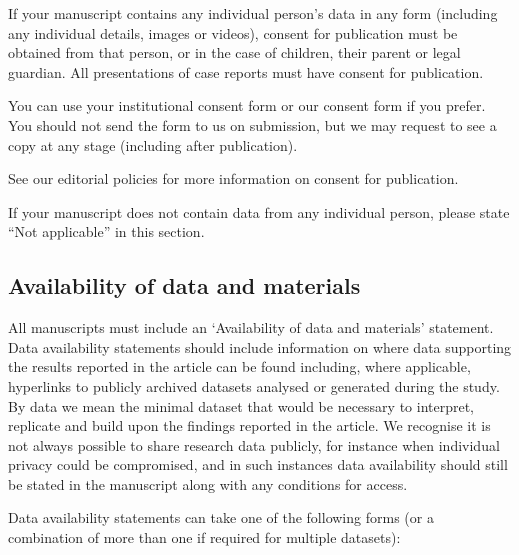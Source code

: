 \documentclass{bmcart}
\begin{document}
\begin{backmatter}
If your manuscript contains any individual person’s data in any form (including any individual details, images or videos), consent for publication must be obtained from that person, or in the case of children, their parent or legal guardian. All presentations of case reports must have consent for publication.

You can use your institutional consent form or our consent form if you prefer. You should not send the form to us on submission, but we may request to see a copy at any stage (including after publication).

See our editorial policies for more information on consent for publication.

If your manuscript does not contain data from any individual person, please state “Not applicable” in this section.

\subsection*{Availability of data and materials}

All manuscripts must include an ‘Availability of data and materials’ statement. Data availability statements should include information on where data supporting the results reported in the article can be found including, where applicable, hyperlinks to publicly archived datasets analysed or generated during the study. By data we mean the minimal dataset that would be necessary to interpret, replicate and build upon the findings reported in the article. We recognise it is not always possible to share research data publicly, for instance when individual privacy could be compromised, and in such instances data availability should still be stated in the manuscript along with any conditions for access.

Data availability statements can take one of the following forms (or a combination of more than one if required for multiple datasets):


\end{backmatter}
\end{document}
